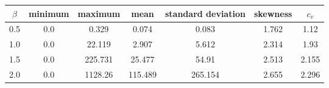 \begin{tabular}{ccccccc}
  \toprule
  \textbf{\(\beta\)} & \textbf{minimum} & \textbf{maximum} & \textbf{mean} & \textbf{standard deviation} & \textbf{skewness} & \textbf{\(c_v\)} \\\midrule
  0.5 & 0.0 & 0.329 & 0.074 & 0.083 & 1.762 & 1.12 \\
  1.0 & 0.0 & 22.119 & 2.907 & 5.612 & 2.314 & 1.93 \\
  1.5 & 0.0 & 225.731 & 25.477 & 54.91 & 2.513 & 2.155 \\
  2.0 & 0.0 & 1128.26 & 115.489 & 265.154 & 2.655 & 2.296 \\\bottomrule
\end{tabular}
